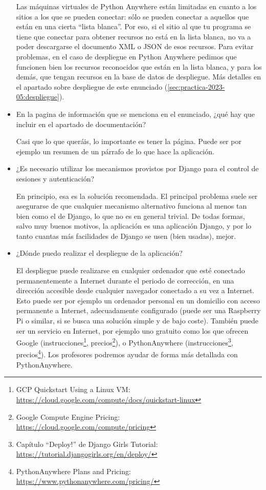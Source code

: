 \begin{itemize}
  Las máquinas virtuales de Python Anywhere están limitadas en cuanto a los sitios a los que se pueden conectar: sólo se pueden conectar a aquellos que están en una cierta ``lista blanca''. Por eso, si el sitio al que tu programa se tiene que conectar para obtener recursos no está en la lista blanca, no va a poder descargarse el documento XML o JSON de esos recursos. Para evitar problemas, en el caso de despliegue en Python Anywhere pedimos que funcionen bien los recursos reconocidos que están en la lista blanca, y para los demás, que tengan recursos en la base de datos de despliegue. Más detalles en el apartado sobre despliegue de este enunciado (\ref{sec:practica-2023-05:despliegue}).
  
\item En la pagina de información que se menciona en el enunciado, ¿qué hay que incluir en el apartado de documentación?

Casi que lo que queráis, lo importante es tener la página. Puede ser por ejemplo un resumen de un párrafo de lo que hace la aplicación.
  
\item ¿Es necesario utilizar los mecanismos provistos por Django para el control de sesiones y autenticación?

  En principio, esa es la solución recomendada. El principal problema suele ser asegurarse de que cualquier mecanismo alternativo funciona al menos tan bien como el de Django, lo que no es en general trivial. De todas formas, salvo muy buenos motivos, la aplicación es una aplicación Django, y por lo tanto cuantas más facilidades de Django se usen (bien usadas), mejor.

\item ¿Dónde puedo realizar el despliegue de la aplicación?

  El despliegue puede realizarse en cualquier ordenador que esté conectado permanentemente a Internet durante el periodo de corrección, en una dirección accesible desde cualquier navegador conectado a su vez a Internet. Esto puede ser por ejemplo un ordenador personal en un domicilio con acceso permanente a Internet, adecuadamente configurado (puede ser una Raspberry Pi o similar, si se busca una solución simple y de bajo coste). También puede ser un servicio en Internet, por ejemplo uno gratuito como los que ofrecen Google (instrucciones\footnote{GCP Quickstart Using a Linux VM:\\ \url{https://cloud.google.com/compute/docs/quickstart-linux}}, precios\footnote{Google Compute Engine Pricing:\\ \url{https://cloud.google.com/compute/pricing}}), o PythonAnywhere (instrucciones\footnote{Capítulo ``Deploy!'' de Django Girls Tutorial:\\ \url{https://tutorial.djangogirls.org/en/deploy/}}, precios\footnote{PythonAnywhere Plans and Pricing:\\ \url{https://www.pythonanywhere.com/pricing/}}). Los profesores podremos ayudar de forma más detallada con PythonAnywhere.


\end{itemize}

